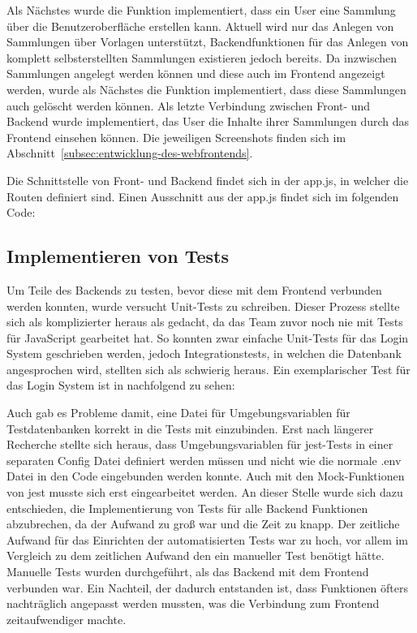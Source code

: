 Als Nächstes wurde die Funktion implementiert, dass ein User eine Sammlung über die Benutzeroberfläche erstellen kann.
Aktuell wird nur das Anlegen von Sammlungen über Vorlagen unterstützt, Backendfunktionen für das Anlegen von komplett selbsterstellten Sammlungen existieren jedoch bereits.
Da inzwischen Sammlungen angelegt werden können und diese auch im Frontend angezeigt werden, wurde als Nächstes die Funktion implementiert, dass diese Sammlungen auch gelöscht werden können.
Als letzte Verbindung zwischen Front- und Backend wurde implementiert, das User die Inhalte ihrer Sammlungen durch das Frontend einsehen können.
Die jeweiligen Screenshots finden sich im Abschnitt~\ref{subsec:entwicklung-des-webfrontends}.

Die Schnittstelle von Front- und Backend findet sich in der app.js, in welcher die Routen definiert sind.
Einen Ausschnitt aus der app.js findet sich im folgenden Code:

\vspace{1em}

\vspace{1em}
\newpage

\subsection{Implementieren von Tests}\label{subsec:implementieren-von-tests}

Um Teile des Backends zu testen, bevor diese mit dem Frontend verbunden werden konnten, wurde versucht Unit-Tests zu schreiben.
Dieser Prozess stellte sich als komplizierter heraus als gedacht, da das Team zuvor noch nie mit Tests für JavaScript gearbeitet hat.
So konnten zwar einfache Unit-Tests für das Login System geschrieben werden, jedoch Integrationstests, in welchen die Datenbank angesprochen wird, stellten sich als schwierig heraus.
Ein exemplarischer Test für das Login System ist in nachfolgend zu sehen:

\vspace{1em}

\vspace{1em}

Auch gab es Probleme damit, eine Datei für Umgebungsvariablen für Testdatenbanken korrekt in die Tests mit einzubinden.
Erst nach längerer Recherche stellte sich heraus, dass Umgebungsvariablen für jest-Tests in einer separaten Config Datei definiert werden müssen und nicht wie die normale .env Datei in den Code eingebunden werden konnte.
Auch mit den Mock-Funktionen von jest musste sich erst eingearbeitet werden.
An dieser Stelle wurde sich dazu entschieden, die Implementierung von Tests für alle Backend Funktionen abzubrechen, da der Aufwand zu groß war und die Zeit zu knapp.
Der zeitliche Aufwand für das Einrichten der automatisierten Tests war zu hoch, vor allem im Vergleich zu dem zeitlichen Aufwand den ein manueller Test benötigt hätte.
Manuelle Tests wurden durchgeführt, als das Backend mit dem Frontend verbunden war.
Ein Nachteil, der dadurch entstanden ist, dass Funktionen öfters nachträglich angepasst werden mussten, was die Verbindung zum Frontend zeitaufwendiger machte.
